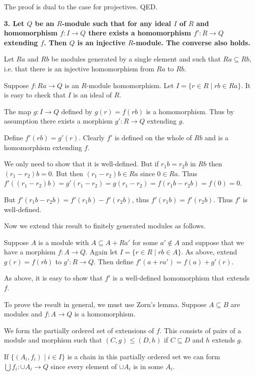 \documentclass[12pt]{article}
\begin{document}
The proof is dual to the case for projectives. QED.

\textbf{3. Let $Q$ be an $R$-module such that for any ideal $I$ of $R$ and homomorphism $f : I \to Q$ there exists a homomorphism $f' : R \to Q$ extending $f$. Then $Q$ is an injective $R$-module. The converse also holds.}

Let $Ra$ and $Rb$ be modules generated by a single element and such that $Ra \subseteq Rb$, i.e. that there is an injective homomorphism from $Ra$ to $Rb$.

Suppose $f : Ra \to Q$ is an $R$-module homomorphism. Let $I = \{r \in R \;|\; rb \in Ra\}$. It is easy to check that $I$ is an ideal of $R$.

The map $g : I \to Q$ defined by $g(r) = f(rb)$ is a homomorphism. Thus by assumption there exists a morphism $g' : R \to Q$ extending $g$.

Define $f'(rb) = g'(r)$. Clearly $f'$ is defined on the whole of $Rb$ and is a homomorphism extending $f$.

We only need to show that it is well-defined. But if $r_1b = r_2b$ in $Rb$ then $(r_1 - r_2)b = 0$. But then $(r_1 - r_2)b \in Ra$ since $0 \in Ra$. Thus $f'((r_1 - r_2)b) = g'(r_1 - r_2) = g(r_1 - r_2) = f(r_1b - r_2b) = f(0) = 0$.

But $f'(r_1b - r_2b) = f'(r_1b) - f'(r_2b)$, thus $f'(r_1b) = f'(r_2b)$. Thus $f'$ is well-defined.

Now we extend this result to finitely generated modules as follows. 

Suppose $A$ is a module with $A \subseteq A + Ra'$ for some $a' \notin A$ and suppose that we have a morphism $f : A \to Q$. Again let $I = \{r \in R \;|\; rb \in A\}$. As above, extend $g(r) = f(rb)$ to $g' : R \to Q$. Then define $f'(a + ra') = f(a) + g'(r)$.

As above, it is easy to show that $f'$ is a well-defined homomorphism that extends $f$.

To prove the result in general, we must use Zorn's lemma. Suppose $A \subseteq B$ are modules and $f : A \to Q$ is a homomorphism.

We form the partially ordered set of extensions of $f$. This consists of pairs of a module and morphism such that $(C, g) \leq (D, h)$ if $C \subseteq D$ and $h$ extends $g$.

If $\{(A_i, f_i) \;|\; i \in I\}$ is a chain in this partially ordered set we can form $\bigcup f_i : \cup A_i \to Q$ since every element of $\cup A_i$ is in some $A_i$.
\end{document}
